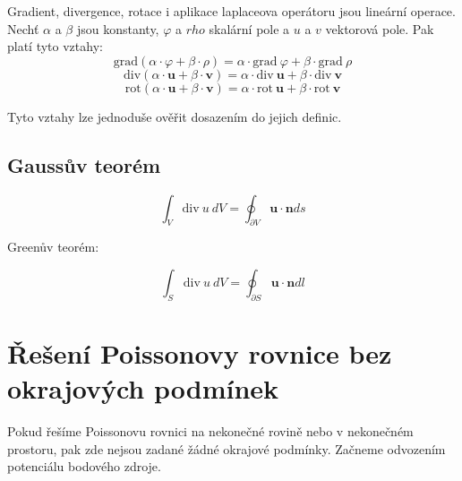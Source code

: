 \documentclass{book}
\newcommand{\vect}[1]{\boldsymbol{#1}}
\newcommand{\grad}{\mathrm{grad}}
\newcommand{\diverg}{\mathrm{div}}
\newcommand{\rot}{\mathrm{rot}}
\begin{document}
Gradient, divergence, rotace i aplikace laplaceova operátoru jsou lineární operace. Nechť \(\alpha\) a \(\beta\) jsou konstanty, \(\varphi\) a \(rho\) skalární pole a \(u\) a \(v\) vektorová pole. Pak platí tyto vztahy:
\[
\grad(\alpha \cdot \varphi + \beta \cdot \rho) = \alpha \cdot \grad \ \varphi + \beta \cdot \grad \ \rho
\]
\[
\diverg(\alpha \cdot \vect{u} + \beta \cdot \vect{v}) = \alpha \cdot \diverg \ \vect{u} + \beta \cdot \diverg \ \vect{v}
\]
\[
\rot(\alpha \cdot \vect{u} + \beta \cdot \vect{v}) = \alpha \cdot \rot \ \vect{u} + \beta \cdot \rot \ \vect{v}
\]

Tyto vztahy lze jednoduše ověřit dosazením do jejich definic.



\subsection{Gaussův teorém}

\begin{equation}
\int_V \diverg \ u \ dV = \oint_{\partial V} \vect{u} \cdot \vect{n} ds
\end{equation}


Greenův teorém:

\begin{equation}
\int_S \diverg \ u \ dV = \oint_{\partial S} \vect{u} \cdot \vect{n} dl
\end{equation}


\section{Řešení Poissonovy rovnice bez okrajových podmínek}

Pokud řešíme Poissonovu rovnici na nekonečné rovině nebo v nekonečném prostoru, pak zde nejsou zadané žádné okrajové podmínky. Začneme odvozením
potenciálu bodového zdroje.
\end{document}
